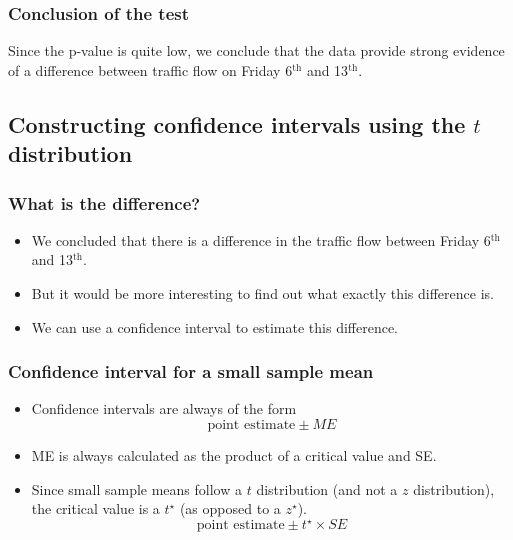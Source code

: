 \documentclass[notes,11pt, aspectratio=169]{beamer}
\begin{document}


\begin{frame}
\frametitle{Conclusion of the test}


\pause

Since the p-value is quite low, we conclude that the data provide strong evidence of a difference between traffic flow on Friday 6$^{\text{th}}$ and 13$^{\text{th}}$.

\end{frame}


\subsection{Constructing confidence intervals using the $t$ distribution}


\begin{frame}
\frametitle{What is the difference?}

\begin{itemize}

\item We concluded that there is a difference in the traffic flow between Friday 6$^{\text{th}}$ and 13$^{\text{th}}$.

\pause

\item But it would be more interesting to find out what exactly this difference is.

\pause

\item We can use a confidence interval to estimate this difference.

\end{itemize}

\end{frame}


\begin{frame}
\frametitle{Confidence interval for a small sample mean}

\begin{itemize}

\item Confidence intervals are always of the form
\[ \text{point estimate} \pm {ME} \]

\pause

\item ME is always calculated as the product of a critical value and SE.

\pause

\item Since small sample means follow a $t$ distribution (and not a $z$ distribution), the critical value is a $t^\star$ (as opposed to a $z^\star$).
\[ \text{point estimate} \pm t^{\star} \times SE \]

\end{itemize}

\end{frame}
\end{document}
